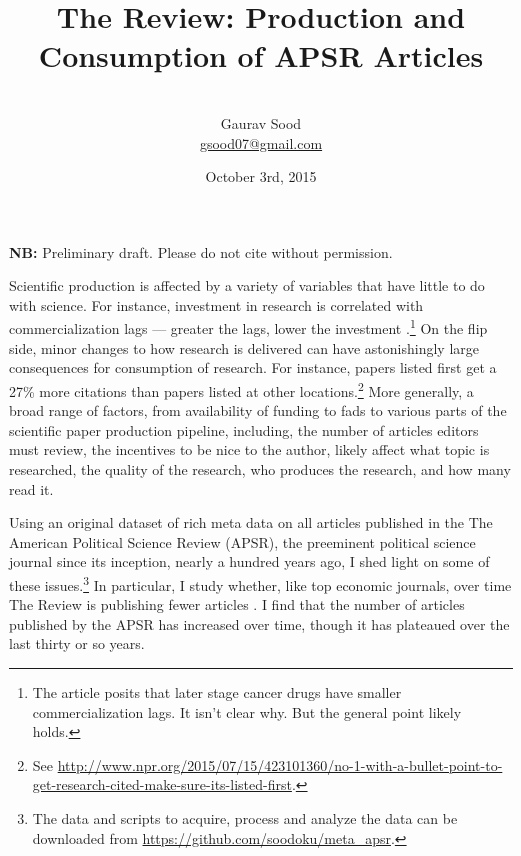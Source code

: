 \documentclass[12pt]{article}
\begin{document}
\title{\vspace{-.5cm}\normalsize{The Review: Production and Consumption of APSR Articles}}
\author{\vspace{.2cm}\\\normalsize{Gaurav Sood}\\\href{mailto:gsood07@gmail.com}{\small{gsood07@gmail.com}}\vspace{.3cm}\\}
\date{\normalsize{October 3rd, 2015}}
\maketitle
\begin{center}
\textbf{NB:} Preliminary draft. Please do not cite without permission.
\end{center}
\vspace{.4cm}
\doublespacing

Scientific production is affected by a variety of variables that have little to do with science. For instance, investment in research is correlated with commercialization lags --- greater the lags, lower the investment \citep{budish2013firms}.\footnote{The article posits that later stage cancer drugs have smaller commercialization lags. It isn't clear why. But the general point likely holds.} On the flip side, minor changes to how research is delivered can have astonishingly large consequences for consumption of research. For instance, papers listed first get a 27\% more citations than papers listed at other locations.\footnote{ See \href{http://www.npr.org/2015/07/15/423101360/no-1-with-a-bullet-point-to-get-research-cited-make-sure-its-listed-first}{http://www.npr.org/2015/07/15/423101360/no-1-with-a-bullet-point-to-get-research-cited-make-sure-its-listed-first}.} More generally, a broad range of factors, from availability of funding to fads to various parts of the scientific paper production pipeline, including, the number of articles editors must review, the incentives to be nice to the author, likely affect what topic is researched, the quality of the research, who produces the research, and how many read it. 

Using an original dataset of rich meta data on all articles published in the The American Political Science Review (APSR), the preeminent political science journal since its inception, nearly a hundred years ago, I shed light on some of these issues.\footnote{The data and scripts to acquire, process and analyze the data can be downloaded from \href{https://github.com/soodoku/meta_apsr}{https://github.com/soodoku/meta\_apsr}.} In particular, I study whether, like top economic journals, over time The Review is publishing fewer articles \citep{card2013nine, card2014page}. I find that the number of articles published by the APSR has increased over time, though it has plateaued over the last thirty or so years.
\end{document}
